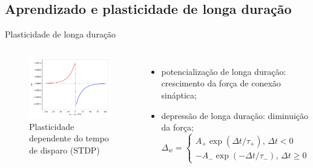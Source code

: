 \subsection{Aprendizado e plasticidade de longa duração}
\begin{frame}{Plasticidade de longa duração}
	\begin{columns}[t]
		\column{5cm}
			\begin{figure}[tb]
				\centering
				\caption{Plasticidade dependente do tempo de disparo (STDP)}
				\label{fig:stdp}
				\includegraphics[width=\linewidth]{figs/stdp}
			\end{figure}
		\column{5cm}
			\begin{itemize}
				\item potencialização de longa duração: crescimento da força de conexão sináptica;
				\item depressão de longa duração: diminuição da força;
				\[
					\Delta_w=\begin{cases}
						A_+\exp(\Delta t/\tau_+)\text{, }\Delta t<0\\
						-A_-\exp(-\Delta t/\tau_-)\text{, }\Delta t\geq0
					\end{cases}
				\]
			\end{itemize}
	\end{columns}
\end{frame}
